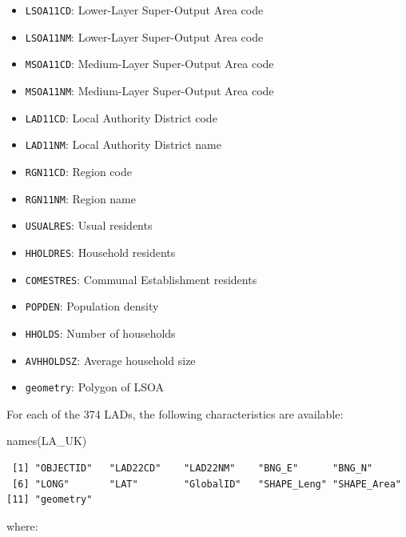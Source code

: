 \documentclass[
  letterpaper,
  DIV=11,
  numbers=noendperiod]{scrreprt}
\newenvironment{Shaded}{\begin{snugshade}}{\end{snugshade}}
\newcommand{\FunctionTok}[1]{\textcolor[rgb]{0.28,0.35,0.67}{#1}}
\newcommand{\NormalTok}[1]{\textcolor[rgb]{0.00,0.23,0.31}{#1}}
\providecommand{\tightlist}{%
  \setlength{\itemsep}{0pt}\setlength{\parskip}{0pt}}\usepackage{longtable,booktabs,array}
\begin{document}
\begin{itemize}
\tightlist
\item
  \texttt{LSOA11CD}: Lower-Layer Super-Output Area code
\item
  \texttt{LSOA11NM}: Lower-Layer Super-Output Area code
\item
  \texttt{MSOA11CD}: Medium-Layer Super-Output Area code
\item
  \texttt{MSOA11NM}: Medium-Layer Super-Output Area code
\item
  \texttt{LAD11CD}: Local Authority District code
\item
  \texttt{LAD11NM}: Local Authority District name
\item
  \texttt{RGN11CD}: Region code
\item
  \texttt{RGN11NM}: Region name
\item
  \texttt{USUALRES}: Usual residents
\item
  \texttt{HHOLDRES}: Household residents
\item
  \texttt{COMESTRES}: Communal Establishment residents
\item
  \texttt{POPDEN}: Population density
\item
  \texttt{HHOLDS}: Number of households
\item
  \texttt{AVHHOLDSZ}: Average household size
\item
  \texttt{geometry}: Polygon of LSOA
\end{itemize}

For each of the 374 LADs, the following characteristics are available:

\begin{Shaded}
\begin{Highlighting}[]
\FunctionTok{names}\NormalTok{(LA\_UK)}
\end{Highlighting}
\end{Shaded}

\begin{verbatim}
 [1] "OBJECTID"   "LAD22CD"    "LAD22NM"    "BNG_E"      "BNG_N"     
 [6] "LONG"       "LAT"        "GlobalID"   "SHAPE_Leng" "SHAPE_Area"
[11] "geometry"  
\end{verbatim}

where:
\end{document}
